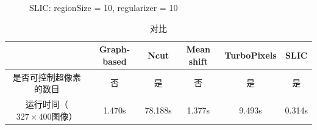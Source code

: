 \documentclass[12pt]{article}
\begin{document}
\begin{figure}
  \centering 
  \caption{SLIC: regionSize = 10, regularizer = 10}
  \label{fig: SLIC} %
\end{figure}

\begin{table}[!h] %
\label{tab: 1}
\centering
\begin{tabular}{|c|c|c|c|c|c|}
\hline
$\quad$ & Graph-based & Ncut & Mean shift & TurboPixels & SLIC \\
\hline
是否可控制超像素的数目 & 否 & 是 & 否 & 是 & 是\\
\hline
运行时间（$327 \times 400$图像）& 1.470s & 78.188s & 1.377s & 9.493s & 0.314s\\
\hline
\end{tabular}  
\caption{对比}
\end{table}
%




\end{document}
